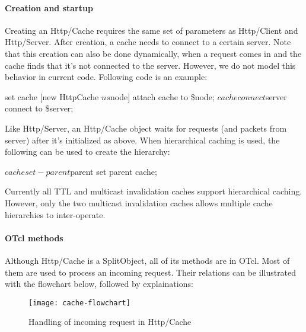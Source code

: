 \paragraph{Creation and startup}

Creating an Http/Cache requires the same set of parameters as
Http/Client and Http/Server. After creation, a cache needs to connect 
to a certain server. Note that this creation can also be done dynamically,
when a request comes in and the cache finds that it's not connected to 
the server. However, we do not model this behavior in current code.
Following code is an example:

\begin{program}
        set cache [new HttpCache $ns $node] \; attach cache to \$node;
        $cache connect $server \; connect to \$server;
\end{program}

Like Http/Server, an Http/Cache object waits for requests (and packets
from server) after it's initialized as above. When hierarchical
caching is used, the following can be used to create the hierarchy:

\begin{program}
        $cache set-parent $parent \; set parent cache;
\end{program}

Currently all TTL and multicast invalidation caches support hierarchical
caching. However, only the two multicast invalidation caches allows 
multiple cache hierarchies to inter-operate.

\paragraph{OTcl methods}

Although Http/Cache is a SplitObject, all of its methods are in OTcl. 
Most of them are used to process an incoming request. Their relations can
be illustrated with the flowchart below, followed by explainations:

\begin{figure}[ht]
  \begin{center}
    \texttt{[image: cache-flowchart]}
    \caption{Handling of incoming request in Http/Cache}
    \label{fig:webcache-handle-request}
  \end{center}
\end{figure}

